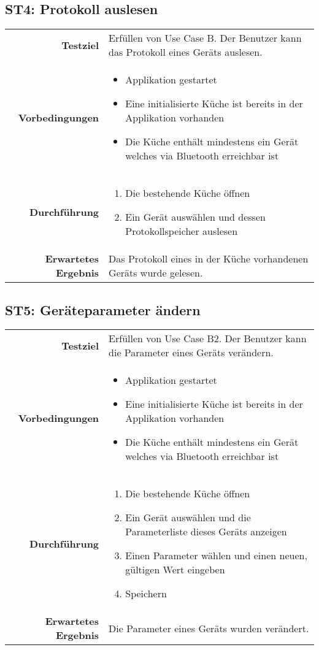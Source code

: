\subsection{ST4: Protokoll auslesen}
\begin{table}[H]
\begin{tabularx}{\textwidth}{r X }
\textbf{Testziel} & Erfüllen von Use Case B. Der Benutzer kann das Protokoll eines Geräts auslesen. \\
\textbf{Vorbedingungen} & \begin{itemize}
\item Applikation gestartet
\item Eine initialisierte Küche ist bereits in der Applikation vorhanden
\item Die Küche enthält mindestens ein Gerät welches via Bluetooth erreichbar ist
\end{itemize} \\
\textbf{Durchführung} & \begin{enumerate}
\item Die bestehende Küche öffnen
\item Ein Gerät auswählen und dessen Protokollspeicher auslesen
\end{enumerate} \\
\textbf{Erwartetes Ergebnis} & Das Protokoll eines in der Küche vorhandenen Geräts wurde gelesen.\\
\end{tabularx}
\end{table}

\subsection{ST5: Geräteparameter ändern}
\begin{table}[H]
\begin{tabularx}{\textwidth}{r X }
\textbf{Testziel} & Erfüllen von Use Case B2. Der Benutzer kann die Parameter eines Geräts verändern. \\
\textbf{Vorbedingungen} & \begin{itemize}
\item Applikation gestartet
\item Eine initialisierte Küche ist bereits in der Applikation vorhanden
\item Die Küche enthält mindestens ein Gerät welches via Bluetooth erreichbar ist
\end{itemize} \\
\textbf{Durchführung} & \begin{enumerate}
\item Die bestehende Küche öffnen
\item Ein Gerät auswählen und die Parameterliste dieses Geräts anzeigen
\item Einen Parameter wählen und einen neuen, gültigen Wert eingeben
\item Speichern
\end{enumerate} \\
\textbf{Erwartetes Ergebnis} & Die Parameter eines Geräts wurden verändert.\\
\end{tabularx}
\end{table}


